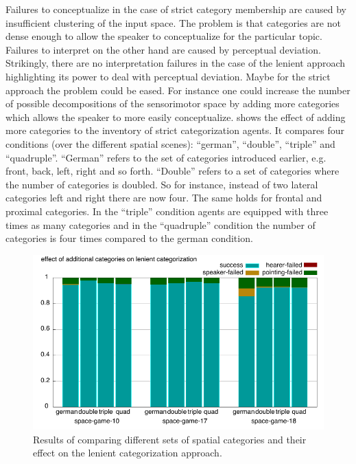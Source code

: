 Failures to conceptualize in the case of strict category membership are caused by 
insufficient clustering of the input space. The problem is that categories are not
dense enough to allow the speaker to conceptualize for the particular topic.
Failures to interpret on the other hand are caused by perceptual deviation.
Strikingly, there are no interpretation failures in the case of the lenient approach
highlighting its power to deal with perceptual deviation. Maybe for the strict
approach the problem could be eased. For instance one could increase
the number of possible decompositions of the sensorimotor space
by adding more categories which allows the speaker to more easily conceptualize.
 shows the effect of 
adding more categories to the inventory of strict categorization agents.
It compares four conditions (over the different spatial scenes):
``german'', ``double'', ``triple'' and ``quadruple''.
``German'' refers to the set of categories introduced earlier, e.g. front, back, left, 
right and so forth. ``Double'' refers to a set of categories where the number of 
categories is doubled. So for instance, instead of two lateral categories left and right 
there are now four. The same holds for frontal and proximal categories. In the ``triple'' 
condition agents are equipped with three times as many categories and in the 
``quadruple'' condition the number of categories is four times compared to the 
german condition. 

\begin{figure}
\begin{center}
\includegraphics[width=.8\columnwidth]{figs/apply-more-categories.pdf}
\end{center}
\caption[Effect of additional categories on lenient categorization]
{Results of comparing different sets of spatial categories and their 
effect on the lenient categorization approach.}
\label{f:apply-increased-categories}
\end{figure}

